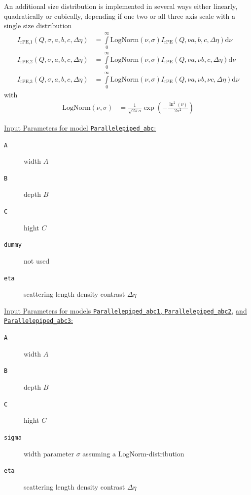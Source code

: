An additional size distribution is implemented in several ways either linearly, quadratically or cubically, depending if one two or all three axis scale with a single size distribution
\begin{align}
I_\text{rPE,1}(Q,\sigma, a, b,c,\Delta\eta) &= \int\limits_0^\infty \textrm{LogNorm}(\nu,\sigma) I_\text{rPE}(Q,\nu a,b,c,\Delta\eta) \mathrm{d}\nu \\
I_\text{rPE,2}(Q,\sigma, a, b,c,\Delta\eta) &= \int\limits_0^\infty \textrm{LogNorm}(\nu,\sigma) I_\text{rPE}(Q,\nu a,\nu b,c,\Delta\eta) \mathrm{d}\nu \\
I_\text{rPE,3}(Q,\sigma, a, b,c,\Delta\eta) &= \int\limits_0^\infty \textrm{LogNorm}(\nu,\sigma) I_\text{rPE}(Q,\nu a,\nu b,\nu c,\Delta\eta) \mathrm{d}\nu
\end{align}
with
\begin{align}
\textrm{LogNorm}(\nu,\sigma) &= \frac{1}{\sqrt{2\pi}\sigma} \exp\left(-\frac{\ln^2(\nu)}{2\sigma^2}\right)
\end{align}

\vspace{5mm}

\noindent \underline{Input Parameters for model \texttt{Parallelepiped\_abc}:}\\
\begin{description}
\item[\texttt{A}] width $A$
\item[\texttt{B}] depth $B$
\item[\texttt{C}] hight $C$
\item[\texttt{dummy}] not used
\item[\texttt{eta}] scattering length density contrast $\Delta\eta$
\end{description}

\noindent \underline{Input Parameters for models \texttt{Parallelepiped\_abc1}, \texttt{Parallelepiped\_abc2}}, \underline{and \texttt{Parallelepiped\_abc3}:}\\
\begin{description}
\item[\texttt{A}] width $A$
\item[\texttt{B}] depth $B$
\item[\texttt{C}] hight $C$
\item[\texttt{sigma}] width parameter $\sigma$ assuming a LogNorm-distribution
\item[\texttt{eta}] scattering length density contrast $\Delta\eta$
\end{description}

